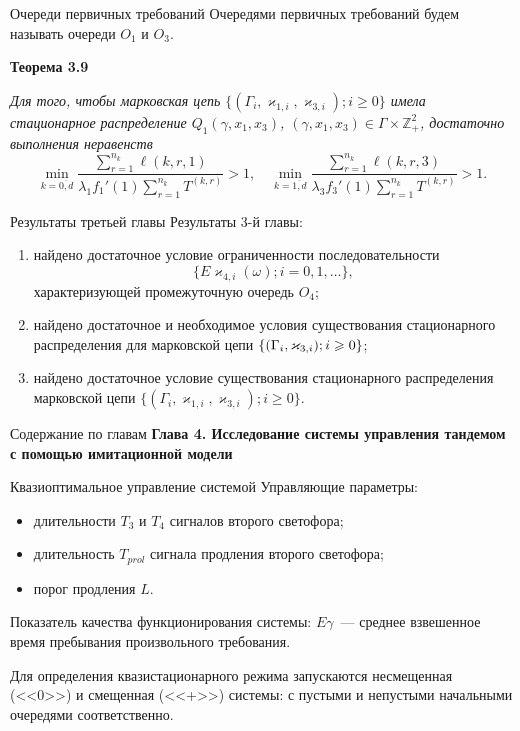 \documentclass[10pt]{beamer}
\newcommand*{\hm}[1]{#1\nobreak\discretionary{}%
	{\hbox{$\mathsurround=0pt #1$}}{}}%
\newcommand{\MarkThree}{\{(\Gamma_i, \varkappa_{3,i}); \hm{} i \geqslant 0\}}
\begin{document}
\begin{frame}{Очереди первичных требований}
Очередями первичных требований будем называть очереди $O_1$ и $O_3$.
\vfill

 {\bf Теорема 3.9}
{\it 
Для того, чтобы марковская цепь $\{(\Gamma_i, \varkappa_{1,i},\varkappa_{3,i}); i \geqslant 0\}$ имела стационарное распределение $Q_1(\gamma,x_1,x_3)$, $(\gamma,x_1,x_3)\in \Gamma \times {\mathbb Z}^2_+$, достаточно выполнения неравенств
\begin{equation}
\min_{k=\overline{0,d}} { \frac{\sum_{r = 1}^{n_k} \ell(k,r,1) }{\lambda_1 f_1'(1) \sum_{r=1}^{n_k} T^{(k,r)} }}>1, \quad 
\min_{k=\overline{1,d}} { \frac{\sum_{r = 1}^{n_k} \ell(k,r,3) }{\lambda_3 f_3'(1) \sum_{r=1}^{n_k} T^{(k,r)} }}>1.
\label{sufficient:double}
\end{equation}

}
\end{frame}


\begin{frame}{Результаты третьей главы}
Результаты 3-й главы:
\begin{enumerate}
    \item найдено достаточное условие ограниченности последовательности $$\{E\varkappa_{4,i}(\omega); i =0, 1, \ldots\},$$ характеризующей промежуточную очередь $O_4$;
    \item найдено достаточное и необходимое условия существования стационарного распределения для марковской цепи $\MarkThree$;
    \item найдено достаточное условие существования стационарного распределения марковской цепи $\{(\Gamma_i, \varkappa_{1,i},\varkappa_{3,i}); i \geqslant 0\}$.
\end{enumerate}

\end{frame}


  \begin{frame}{Содержание по главам}
  \Large{\textbf{Глава 4. Исследование системы управления тандемом с помощью имитационной модели}}\par
\end{frame}

\begin{frame}{Квазиоптимальное управление системой}
    Управляющие параметры:
    
    \begin{itemize}
        \item длительности $T_3$ и $T_4$ сигналов второго светофора;
        \item длительность $T_{prol}$ сигнала продления второго светофора;
        \item порог продления $L$.
    \end{itemize}
    
    Показатель качества функционирования системы: $E \gamma$~--- среднее взвешенное время пребывания произвольного требования.
    
    Для определения квазистационарного режима запускаются несмещенная (<<0>>) и смещенная (<<+>>) системы: с пустыми и непустыми начальными очередями соответственно. 
\end{frame}
\end{document}
